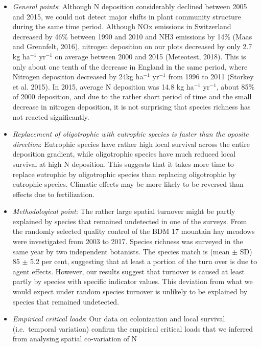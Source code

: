 \documentclass[fleqn,10pt,lineno]{wlpeerj} %
\theoremstyle{definition}
\theoremstyle{definition}
\theoremstyle{definition}
\theoremstyle{remark}
\begin{document}
\begin{itemize}
\item
  \emph{General points}: Although N deposition considerably declined
  between 2005 and 2015, we could not detect major shifts in plant
  community structure during the same time period. Although NOx
  emissions in Switzerland decreased by 46\% between 1990 and 2010 and
  NH3 emissions by 14\% (Maas and Grennfelt, 2016), nitrogen deposition
  on our plots decreased by only 2.7 kg ha\(^{-1}\) yr\(^{-1}\) on
  average between 2000 and 2015 (Meteotest, 2018). This is only about
  one tenth of the decrease in England in the same period, where
  Nitrogen deposition decreased by 24kg ha\(^{-1}\) yr\(^{-1}\) from
  1996 to 2011 (Storkey et al. 2015). In 2015, average N deposition was
  14.8 kg ha\(^{-1}\) yr\(^{-1}\), about 85\% of 2000 deposition, and
  due to the rather short period of time and the small decrease in
  nitrogen deposition, it is not surprising that species richness has
  not reacted significantly.
\item
  \emph{Replacement of oligotrophic with eutrophic species is faster
  than the oposite direction}: Eutrophic species have rather high local
  survival across the entire deposition gradient, while oligotrophic
  species have much reduced local survival at high N deposition. This
  suggests that it takes more time to replace eutrophic by oligotrophic
  species than replacing oligotrophic by eutrophic species. Climatic
  effects may be more likely to be reversed than effects due to
  fertilization.
\item
  \emph{Methodological point}: The rather large spatial turnover might
  be partly explained by species that remained undetected in one of the
  surveys. From the randomly selected quality control of the BDM 17
  mountain hay meadows were investigated from 2003 to 2017. Species
  richness was surveyed in the same year by two independent botanists.
  The species match is (mean \(\pm\) SD) 85 \(\pm\) 5.2 per cent,
  suggesting that at least a portion of the turn over is due to agent
  effects. However, our results suggest that turnover is caused at least
  partly by species with specific indicator values. This deviation from
  what we would expect under random species turnover is unlikely to be
  explained by species that remained undetected.
\item
  \emph{Empirical critical loads}: Our data on colonization and local
  survival (i.e.~temporal variation) confirm the empirical critical
  loads that we inferred from analysing spatial co-variation of N

\end{itemize}
\end{document}
